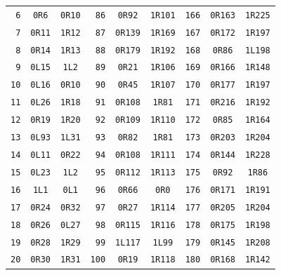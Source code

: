 \begin{longtable}{@{}rcc@{\hspace{1.6em}}rcc@{\hspace{1.6em}}rcc@{}}
\texttt{6} & \texttt{0R6} & \texttt{0R10} & \texttt{86} & \texttt{0R92} & \texttt{1R101} & \texttt{166} & \texttt{0R163} & \texttt{1R225}\\
\texttt{7} & \texttt{0R11} & \texttt{1R12} & \texttt{87} & \texttt{0R139} & \texttt{1R169} & \texttt{167} & \texttt{0R172} & \texttt{1R197}\\
\texttt{8} & \texttt{0R14} & \texttt{1R13} & \texttt{88} & \texttt{0R179} & \texttt{1R192} & \texttt{168} & \texttt{0R86} & \texttt{1L198}\\
\texttt{9} & \texttt{0L15} & \texttt{1L2} & \texttt{89} & \texttt{0R21} & \texttt{1R106} & \texttt{169} & \texttt{0R166} & \texttt{1R148}\\
\texttt{10} & \texttt{0L16} & \texttt{0R10} & \texttt{90} & \texttt{0R45} & \texttt{1R107} & \texttt{170} & \texttt{0R177} & \texttt{1R197}\\
\texttt{11} & \texttt{0L26} & \texttt{1R18} & \texttt{91} & \texttt{0R108} & \texttt{1R81} & \texttt{171} & \texttt{0R216} & \texttt{1R192}\\
\texttt{12} & \texttt{0R19} & \texttt{1R20} & \texttt{92} & \texttt{0R109} & \texttt{1R110} & \texttt{172} & \texttt{0R85} & \texttt{1R164}\\
\texttt{13} & \texttt{0L93} & \texttt{1L31} & \texttt{93} & \texttt{0R82} & \texttt{1R81} & \texttt{173} & \texttt{0R203} & \texttt{1R204}\\
\texttt{14} & \texttt{0L11} & \texttt{0R22} & \texttt{94} & \texttt{0R108} & \texttt{1R111} & \texttt{174} & \texttt{0R144} & \texttt{1R228}\\
\texttt{15} & \texttt{0L23} & \texttt{1L2} & \texttt{95} & \texttt{0R112} & \texttt{1R113} & \texttt{175} & \texttt{0R92} & \texttt{1R86}\\
\texttt{16} & \texttt{1L1} & \texttt{0L1} & \texttt{96} & \texttt{0R66} & \texttt{0R0} & \texttt{176} & \texttt{0R171} & \texttt{1R191}\\
\texttt{17} & \texttt{0R24} & \texttt{0R32} & \texttt{97} & \texttt{0R27} & \texttt{1R114} & \texttt{177} & \texttt{0R205} & \texttt{1R204}\\
\texttt{18} & \texttt{0R26} & \texttt{0L27} & \texttt{98} & \texttt{0R115} & \texttt{1R116} & \texttt{178} & \texttt{0R175} & \texttt{1R198}\\
\texttt{19} & \texttt{0R28} & \texttt{1R29} & \texttt{99} & \texttt{1L117} & \texttt{1L99} & \texttt{179} & \texttt{0R145} & \texttt{1R208}\\
\texttt{20} & \texttt{0R30} & \texttt{1R31} & \texttt{100} & \texttt{0R19} & \texttt{1R118} & \texttt{180} & \texttt{0R168} & \texttt{1R142}\\

\end{longtable}
